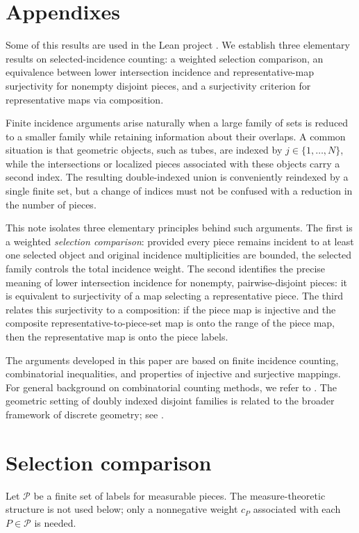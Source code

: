 \documentclass[11pt, letterpaper]{nyjm}
\newcommand{\calP}{\mathcal{P}}
\begin{document}
\section{Appendixes}
\appendix
Some of this results are used in the Lean project \cite{Aspegren2026Lean}.
We establish three elementary results on selected-incidence counting: a weighted selection comparison, an equivalence between lower intersection incidence and representative-map surjectivity for nonempty disjoint pieces, and a surjectivity criterion for representative maps via composition. 

Finite incidence arguments arise naturally when a large family of sets is
reduced to a smaller family while retaining information about their
overlaps. A common situation is that geometric objects, such as tubes,
are indexed by $j\in\{1,\ldots,N\}$, while the intersections or localized
pieces associated with these objects carry a second index.  The resulting
double-indexed union is conveniently reindexed by a single finite set,
but a change of indices must not be confused with a reduction in the
number of pieces.

This note isolates three elementary principles behind such arguments.
The first is a weighted \emph{selection comparison}: provided every
piece remains incident to at least one selected object and original
incidence multiplicities are bounded, the selected family controls the
total incidence weight. The second identifies the precise meaning of
lower intersection incidence for nonempty, pairwise-disjoint pieces:
it is equivalent to surjectivity of a map selecting a representative
piece. The third relates this surjectivity to a composition: if the
piece map is injective and the composite representative-to-piece-set
map is onto the range of the piece map, then the representative map is
onto the piece labels.

The arguments developed in this paper are based on
finite incidence counting, combinatorial inequalities,
and properties of injective and surjective mappings.
For general background on combinatorial counting
methods, we refer to \cite{vanLintWilson}.
The geometric setting of doubly indexed disjoint
families is related to the broader framework of
discrete geometry; see \cite{Matousek}.

\section{Selection comparison}

Let $\calP$ be a finite set of labels for measurable pieces. The
measure-theoretic structure is not used below; only a nonnegative weight
$c_P$ associated with each $P\in\calP$ is needed.
\end{document}
